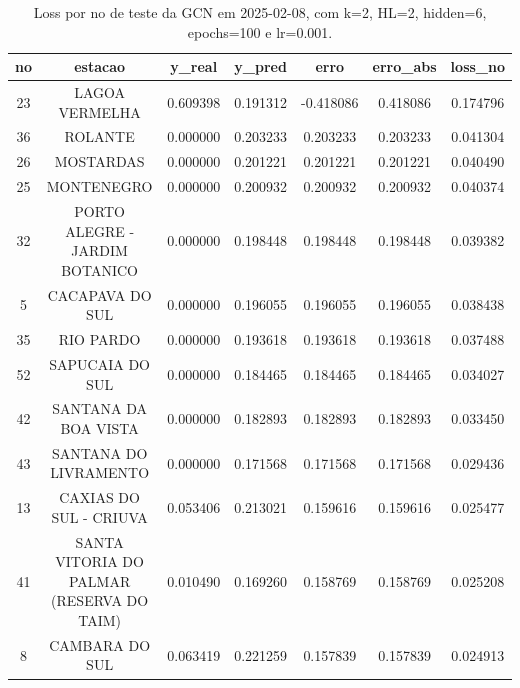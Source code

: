 \begin{table}[h]
\centering
\caption{Loss por no de teste da GCN em 2025-02-08, com k=2, HL=2, hidden=6, epochs=100 e lr=0.001.}
\label{tab:gcn_loss_k2_hl2_h6_e100_d20250208}
\begin{tabular}{ccccccc}
\toprule
no & estacao & y\_real & y\_pred & erro & erro\_abs & loss\_no \\
\midrule
23 & LAGOA VERMELHA & 0.609398 & 0.191312 & -0.418086 & 0.418086 & 0.174796 \\
36 & ROLANTE & 0.000000 & 0.203233 & 0.203233 & 0.203233 & 0.041304 \\
26 & MOSTARDAS & 0.000000 & 0.201221 & 0.201221 & 0.201221 & 0.040490 \\
25 & MONTENEGRO & 0.000000 & 0.200932 & 0.200932 & 0.200932 & 0.040374 \\
32 & PORTO ALEGRE - JARDIM BOTANICO & 0.000000 & 0.198448 & 0.198448 & 0.198448 & 0.039382 \\
5 & CACAPAVA DO SUL & 0.000000 & 0.196055 & 0.196055 & 0.196055 & 0.038438 \\
35 & RIO PARDO & 0.000000 & 0.193618 & 0.193618 & 0.193618 & 0.037488 \\
52 & SAPUCAIA DO SUL & 0.000000 & 0.184465 & 0.184465 & 0.184465 & 0.034027 \\
42 & SANTANA DA BOA VISTA & 0.000000 & 0.182893 & 0.182893 & 0.182893 & 0.033450 \\
43 & SANTANA DO LIVRAMENTO & 0.000000 & 0.171568 & 0.171568 & 0.171568 & 0.029436 \\
13 & CAXIAS DO SUL - CRIUVA & 0.053406 & 0.213021 & 0.159616 & 0.159616 & 0.025477 \\
41 & SANTA VITORIA DO PALMAR (RESERVA DO TAIM) & 0.010490 & 0.169260 & 0.158769 & 0.158769 & 0.025208 \\
8 & CAMBARA DO SUL & 0.063419 & 0.221259 & 0.157839 & 0.157839 & 0.024913 \\
\bottomrule
\end{tabular}
\end{table}
